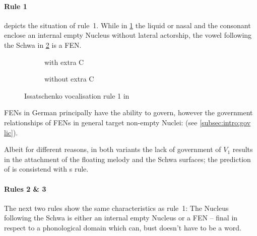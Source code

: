 \paragraph{Rule 1}
depicts the situation of rule~1.
While in \ref{fig:issatschenko voc rule 1:L C end}
the liquid or nasal and the consonant enclose an
internal empty Nucleus without lateral actorship,
the vowel following the Schwa in
\ref{fig:issatschenko voc rule 1:L end}
is a \gls{FEN}.

\begin{figure}[h]
  \centering
  \begin{subfigure}{.49\textwidth}
    \centering
    \begin{structure}{}
      \V[floating]{\textschwa}
      \emptyV[gov]
      \fen
    \end{structure}
    \caption{with extra C}
    \label{fig:issatschenko voc rule 1:L C end}
  \end{subfigure}
  \hfill
  \begin{subfigure}{.49\textwidth}
    \centering
    \begin{structure}{}
      \V[floating]{\textschwa}
      \fen
    \end{structure}
    \caption{without extra C}
    \label{fig:issatschenko voc rule 1:L end}
  \end{subfigure}
  \caption{Issatschenko vocalisation rule 1 in \CVCV}
  \label{fig:issatschenko voc rule 1}
\end{figure}

\Glspl{FEN} in German principally have the ability
to govern, however the government relationships of
\glspl{FEN} in general  target
non-empty Nuclei:
 (see \cref{subsec:intro:gov lic}).

Albeit for different reasons, in both variants
the lack of government of $V_1$ results in the
attachment of the floating melody and the Schwa
surfaces; the prediction of \CVCV is consistend with
\citeauthor{issatschenko1974}s rule.

\paragraph{Rules 2 \& 3}
The next two rules show the same characteristics
as rule~1: The Nucleus following the Schwa is either
an internal empty Nucleus or a \gls{FEN}
-- final in respect to a phonological domain
which can, bust doesn't have to be a word.

